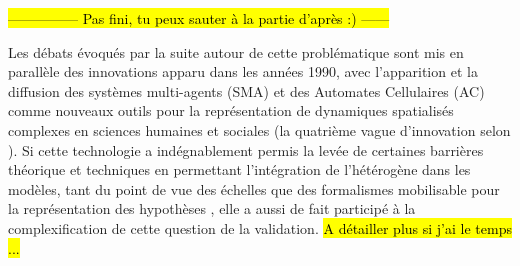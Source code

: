 





\hl{--------------- Pas fini, tu peux sauter à la partie d'après :) ------}

Les débats évoqués par la suite autour de cette problématique sont mis en parallèle des innovations apparu dans les années 1990, avec l'apparition et la diffusion des systèmes multi-agents (SMA) et des Automates Cellulaires (AC) comme nouveaux outils pour la représentation de dynamiques spatialisés complexes en sciences humaines et sociales (la quatrième vague d'innovation selon \autocite{Banos2013a}). Si cette technologie a indégnablement permis la levée de certaines barrières théorique et techniques en permettant l'intégration de l'hétérogène dans les modèles, tant du point de vue des échelles que des formalismes mobilisable pour la représentation des hypothèses , elle a aussi de fait participé à la complexification de cette question de la validation. \autocite[38-41]{Varenne2013} \hl{A détailler plus si j'ai le temps ... }

